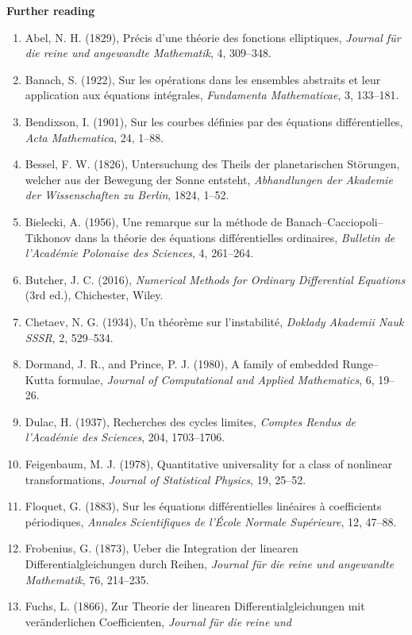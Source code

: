 \documentclass[11pt,a4paper]{article}
\numberwithin{equation}{section}
\theoremstyle{definition}
\newcommand{\subhead}[1]{%
  \par\medskip\noindent\textbf{#1}\par\nobreak\smallskip}
\begin{document}
\subhead{Further reading}
\begin{enumerate}
\item Abel, N. H. (1829), Pr\'ecis d'une th\'eorie des fonctions elliptiques, \emph{Journal f\"ur die reine und angewandte Mathematik}, 4, 309--348.
\item Banach, S. (1922), Sur les op\'erations dans les ensembles abstraits et leur application aux \'equations int\'egrales, \emph{Fundamenta
Mathematicae}, 3, 133--181.
\item Bendixson, I. (1901), Sur les courbes d\'efinies par des \'equations diff\'erentielles, \emph{Acta Mathematica}, 24, 1--88.
\item Bessel, F. W. (1826), Untersuchung des Theils der planetarischen St\"orungen, welcher aus der Bewegung der Sonne entsteht, \emph{Abhandlungen der
Akademie der Wissenschaften zu Berlin}, 1824, 1--52.
\item Bielecki, A. (1956), Une remarque sur la m\'ethode de Banach--Cacciopoli--Tikhonov dans la th\'eorie des \'equations diff\'erentielles
ordinaires, \emph{Bulletin de l'Acad\'emie Polonaise des Sciences}, 4, 261--264.
\item Butcher, J. C. (2016), \emph{Numerical Methods for Ordinary Differential Equations} (3rd ed.), Chichester, Wiley.
\item Chetaev, N. G. (1934), Un th\'eor\`eme sur l'instabilit\'e, \emph{Doklady Akademii Nauk SSSR}, 2, 529--534.
\item Dormand, J. R., and Prince, P. J. (1980), A family of embedded Runge--Kutta formulae, \emph{Journal of Computational and Applied Mathematics},
6, 19--26.
\item Dulac, H. (1937), Recherches des cycles limites, \emph{Comptes Rendus de l'Acad\'emie des Sciences}, 204, 1703--1706.
\item Feigenbaum, M. J. (1978), Quantitative universality for a class of nonlinear transformations, \emph{Journal of Statistical Physics}, 19, 25--52.
\item Floquet, G. (1883), Sur les \'equations diff\'erentielles lin\'eaires \`a coefficients p\'eriodiques, \emph{Annales Scientifiques de l'\'Ecole
Normale Sup\'erieure}, 12, 47--88.
\item Frobenius, G. (1873), Ueber die Integration der linearen Differentialgleichungen durch Reihen, \emph{Journal f\"ur die reine und angewandte
Mathematik}, 76, 214--235.
\item Fuchs, L. (1866), Zur Theorie der linearen Differentialgleichungen mit ver\"anderlichen Coefficienten, \emph{Journal f\"ur die reine und
}
\end{enumerate}
\end{document}
